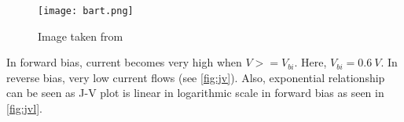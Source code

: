 \begin{figure}[h!]
     \centering
        \texttt{[image: bart.png]}
         \caption{Image taken from \cite{bart}}
		 \label{fig:jv_bart}     
     \end{figure}

In forward bias, current becomes very high when $V>=V_{bi}$. Here, $V_{bi} = 0.6\ V$. In reverse bias, very low current flows (see  \ref{fig:jv}). Also, exponential relationship can be seen as J-V plot is linear in logarithmic scale in forward bias as seen in \ref{fig:jvl}.
